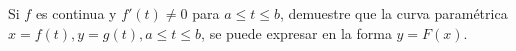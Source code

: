 \item Si $f$ es continua y $f'(t) \ne 0$ para $a \le t \le b$, demuestre que la curva paramétrica $x = f(t), y = g(t), a \le t \le b$, se puede expresar en la forma $y = F(x)$.
